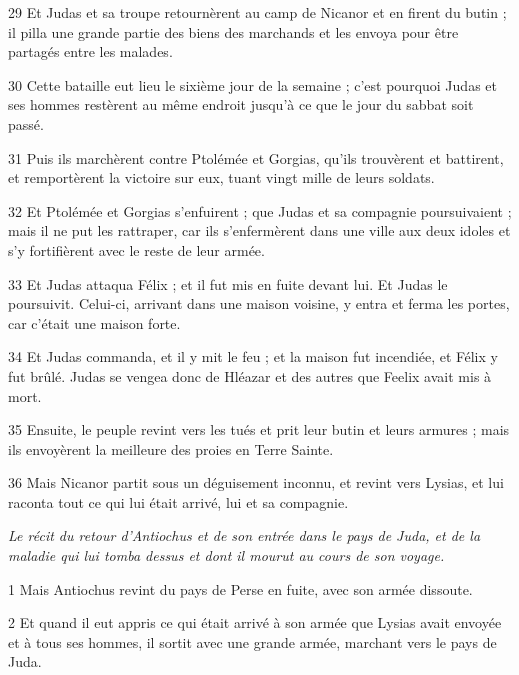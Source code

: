 \par 29 Et Judas et sa troupe retournèrent au camp de Nicanor et en firent du butin ; il pilla une grande partie des biens des marchands et les envoya pour être partagés entre les malades.

\par 30 Cette bataille eut lieu le sixième jour de la semaine ; c'est pourquoi Judas et ses hommes restèrent au même endroit jusqu'à ce que le jour du sabbat soit passé.

\par 31 Puis ils marchèrent contre Ptolémée et Gorgias, qu'ils trouvèrent et battirent, et remportèrent la victoire sur eux, tuant vingt mille de leurs soldats.

\par 32 Et Ptolémée et Gorgias s'enfuirent ; que Judas et sa compagnie poursuivaient ; mais il ne put les rattraper, car ils s'enfermèrent dans une ville aux deux idoles et s'y fortifièrent avec le reste de leur armée.

\par 33 Et Judas attaqua Félix ; et il fut mis en fuite devant lui. Et Judas le poursuivit. Celui-ci, arrivant dans une maison voisine, y entra et ferma les portes, car c'était une maison forte.

\par 34 Et Judas commanda, et il y mit le feu ; et la maison fut incendiée, et Félix y fut brûlé. Judas se vengea donc de Hléazar et des autres que Feelix avait mis à mort.

\par 35 Ensuite, le peuple revint vers les tués et prit leur butin et leurs armures ; mais ils envoyèrent la meilleure des proies en Terre Sainte.

\par 36 Mais Nicanor partit sous un déguisement inconnu, et revint vers Lysias, et lui raconta tout ce qui lui était arrivé, lui et sa compagnie.


\par \textit{Le récit du retour d'Antiochus et de son entrée dans le pays de Juda, et de la maladie qui lui tomba dessus et dont il mourut au cours de son voyage.}

\par 1 Mais Antiochus revint du pays de Perse en fuite, avec son armée dissoute.

\par 2 Et quand il eut appris ce qui était arrivé à son armée que Lysias avait envoyée et à tous ses hommes, il sortit avec une grande armée, marchant vers le pays de Juda.

